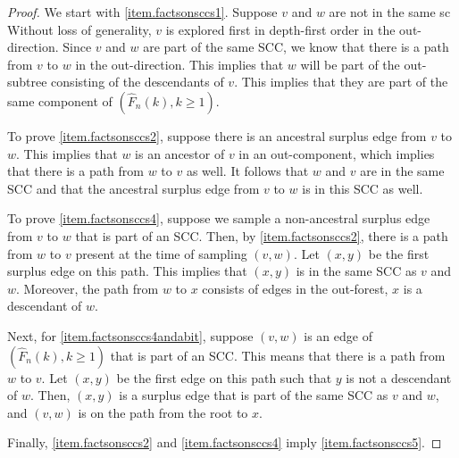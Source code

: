 \begin{proof}
We start with \ref{item.factsonsccs1}. Suppose $v$ and $w$ are not in the same sc Without loss of generality, $v$ is explored first in depth-first order in the out-direction. Since $v$ and $w$ are part of the same SCC, we know that there is a path from $v$ to $w$ in the out-direction. This implies that $w$ will be part of the out-subtree consisting of the descendants of $v$. This implies that they are part of the same component of $(\hat{F}_n(k),k\geq 1)$.

To prove \ref{item.factsonsccs2}, suppose there is an ancestral surplus edge from $v$ to $w$. This implies that $w$ is an ancestor of $v$ in an out-component, which implies that there is a path from $w$ to $v$ as well. It follows that $w$ and $v$ are in the same SCC and that the ancestral surplus edge from $v$ to $w$ is in this SCC as well. 

To prove \ref{item.factsonsccs4}, suppose we sample a non-ancestral surplus edge from $v$ to $w$ that is part of an SCC. Then, by \ref{item.factsonsccs2}, there is a path from $w$ to $v$ present at the time of sampling $(v,w)$. Let $(x,y)$ be the first surplus edge on this path. This implies that $(x,y)$ is in the same SCC as $v$ and $w$. Moreover, the path from $w$ to $x$ consists of edges in the out-forest, $x$ is a descendant of $w$.

Next, for \ref{item.factsonsccs4andabit}, suppose $(v,w)$ is an edge of $(\hat{F}_n(k),k\geq 1)$ that is part of an SCC. This means that there is a path from $w$ to $v$. Let $(x,y)$ be the first edge on this path such that $y$ is not a descendant of $w$. Then, $(x,y)$ is a surplus edge that is part of the same SCC as $v$ and $w$, and $(v,w)$ is on the path from the root to $x$. 

Finally, \ref{item.factsonsccs2} and \ref{item.factsonsccs4} imply \ref{item.factsonsccs5}. 
\end{proof}

